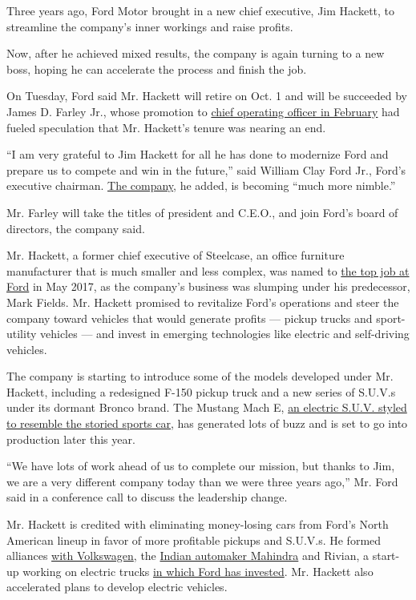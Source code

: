 Three years ago, Ford Motor brought in a new chief executive, Jim
Hackett, to streamline the company's inner workings and raise profits.

Now, after he achieved mixed results, the company is again turning to a
new boss, hoping he can accelerate the process and finish the job.

On Tuesday, Ford said Mr. Hackett will retire on Oct. 1 and will be
succeeded by James D. Farley Jr., whose promotion to
\href{https://www.nytimes.com/2020/02/07/business/ford-motor-jim-farley.html}{chief
operating officer in February} had fueled speculation that Mr. Hackett's
tenure was nearing an end.

``I am very grateful to Jim Hackett for all he has done to modernize
Ford and prepare us to compete and win in the future,'' said William
Clay Ford Jr., Ford's executive chairman.
\href{https://www.nytimes.com/topic/company/ford-motor-company}{The
company}, he added, is becoming ``much more nimble.''

Mr. Farley will take the titles of president and C.E.O., and join Ford's
board of directors, the company said.

Mr. Hackett, a former chief executive of Steelcase, an office furniture
manufacturer that is much smaller and less complex, was named to
\href{https://www.nytimes.com/2017/05/22/business/jim-hackett-ford.html}{the
top job at Ford} in May 2017, as the company's business was slumping
under his predecessor, Mark Fields. Mr. Hackett promised to revitalize
Ford's operations and steer the company toward vehicles that would
generate profits --- pickup trucks and sport-utility vehicles --- and
invest in emerging technologies like electric and self-driving vehicles.

The company is starting to introduce some of the models developed under
Mr. Hackett, including a redesigned F-150 pickup truck and a new series
of S.U.V.s under its dormant Bronco brand. The Mustang Mach E,
\href{https://www.nytimes.com/2019/11/17/business/ford-mustang-electric-suv.html}{an
electric S.U.V. styled to resemble the storied sports car}, has
generated lots of buzz and is set to go into production later this year.

``We have lots of work ahead of us to complete our mission, but thanks
to Jim, we are a very different company today than we were three years
ago,'' Mr. Ford said in a conference call to discuss the leadership
change.

Mr. Hackett is credited with eliminating money-losing cars from Ford's
North American lineup in favor of more profitable pickups and S.U.V.s.
He formed alliances
\href{https://www.nytimes.com/2019/07/05/business/ford-vw-self-driving-electric-cars.html}{with
Volkswagen}, the
\href{https://www.nytimes.com/2019/10/01/business/ford-india.html}{Indian
automaker Mahindra} and Rivian, a start-up working on electric trucks
\href{https://www.nytimes.com/2019/04/24/business/ford-rivian-investment.html}{in
which Ford has invested}. Mr. Hackett also accelerated plans to develop
electric vehicles.

